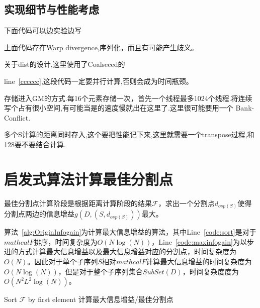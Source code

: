 \subsection{实现细节与性能考虑}

下面代码可以边实验边写

上面代码存在Warp divergence,序列化，而且有可能产生歧义。

关于dist的设计,这里使用了Coalseced的

line~\ref{cccccc},这段代码一定要并行计算,否则会成为时间瓶颈。

{\color{red}{可能不需要下面这段思路了,直接使用下下段就可以了}}
存储进入GM的方式.每16个元素存储一次，首先一个线程最多1024个线程.将连续写个占有很小空间,有可能当是的速度慢就出在这里了.这里很可能要用一个 Bank-Conflict.

多个S计算的距离同时存入,这个要把性能记下来,这里就需要一个transpose过程,和128要不要结合计算.

\section{启发式算法计算最佳分割点}
\label{cha:myalg:infogain}

{\color{red}{到底求最大信息增益还是求最小条件熵，这个可以在后面解释一下}}

最佳分割点计算阶段是根据距离计算阶段的结果$\mathcal{F}$，求出一个分割点$d_{osp(S)}$使得分割点两边的信息增益$g(D,(S,d_{osp(S)}))$最大。

算法~\ref{alg:OriginInfogain}为计算最大信息增益的算法，其中Line~\ref{code:sort}是对于$mathcal{F}$排序，时间复杂度为$O(N\log(N))$，Line~\ref{code:maxinfogain}为以步进的方式计算最大信息增益以及最大信息增益对应的分割点，时间复杂度为$O(N)$。因此对于单个子序列$S$相对$mathcal{F}$计算最大信息增益的时间复杂度为$O(N\log(N))$，但是对于整个子序列集合$SubSet(D)$，时间复杂度度为$O(N^2L^2\log(N))$。

{\color{red}{这个函数应该重写一些，名字统一，起什么名字，查一下论文}}

\begin{algorithm}
	\caption{$SplitInfogain$}
	\label{alg:OriginInfogain}
	\begin{algorithmic}[1]
			\State Sort $\mathcal{F}$ by first element \label{code:sort}
			\State 计算最大信息增益/最佳分割点 \label{code:maxinfogain}
		\EndFunction
	\end{algorithmic}
\end{algorithm}

